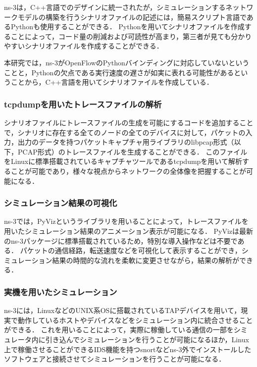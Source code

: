 ns-3は，C++言語でのデザインに統一されたが，シミュレーションするネットワークモデルの構築を行うシナリオファイルの記述には，簡易スクリプト言語であるPythonも使用することができる．
Pythonを用いてシナリオファイルを作成することによって，コード量の削減および可読性が高まり，第三者が見ても分かりやすいシナリオファイルを作成することができる．

本研究では，ns-3がOpenFlowのPythonバインディングに対応していないということと，Pythonの欠点である実行速度の遅さが如実に表れる可能性があるということから，C++言語を用いてシナリオファイルを作成している．

\subsubsection{tcpdumpを用いたトレースファイルの解析}

シナリオファイルにトレースファイルの生成を可能にするコードを追加することで，シナリオに存在する全てのノードの全てのデバイスに対して，パケットの入力，出力のデータを持つパケットキャプチャ用ライブラリのlibpcap形式（以下，PCAP形式）のトレースファイルを生成することができる．
このファイルをLinuxに標準搭載されているキャプチャツールであるtcpdumpを用いて解析することが可能であり，様々な視点からネットワークの全体像を把握することが可能になる．

\subsubsection{シミュレーション結果の可視化}

ns-3では，PyVizというライブラリを用いることによって，トレースファイルを用いたシミュレーション結果のアニメーション表示が可能になる．
PyVizは最新のns-3パッケージに標準搭載されているため，特別な導入操作などは不要である．
パケットの通信経路，転送速度などを可視化して表示することができ，シミュレーション結果の時間的な流れを柔軟に変更させながら，結果の解析ができる．

\subsubsection{実機を用いたシミュレーション}

ns-3には，LinuxなどのUNIX系OSに搭載されているTAPデバイスを用いて，現実で動作しているホストやデバイスなどをシミュレーション内に統合させることができる．
これを用いることによって，実際に稼働している通信の一部をシミュレータ内に引き込んでシミュレーションを行うことが可能になるほか，Linux上で稼働させることができるIDS機能を持つsnortなどns-3外でインストールしたソフトウェアと接続させてシミュレーションを行うことが可能になる．

